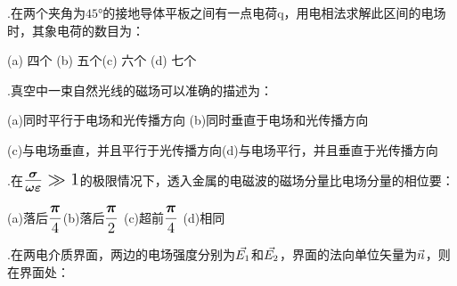.\hspace{0.8em}在两个夹角为$\ang{45}$的接地导体平板之间有一点电荷q，用电相法求解此区间的电场时，其象电荷的数目为：

\vspace{0.3cm}
(a)\hspace{0.6em} 四个 \hspace{1.6em}(b)\hspace{0.6em} 五个\hspace{1.6em}(c)\hspace{0.6em} 六个 \hspace{1.6em}(d)\hspace{0.6em} 七个
\vspace{0.3cm}

.\hspace{0.8em}真空中一束自然光线的磁场可以准确的描述为：

\vspace{0.3cm}
(a)\hspace{0.6em}同时平行于电场和光传播方向 \hspace{4.2em}(b)\hspace{0.6em}同时垂直于电场和光传播方向\hspace{1.6em}

(c)\hspace{0.6em}与电场垂直，并且平行于光传播方向\hspace{1.6em}(d)\hspace{0.6em}与电场平行，并且垂直于光传播方向
\vspace{0.3cm}

.\hspace{0.8em}在$\Large{ \boldsymbol{ \frac{\sigma}{\omega\varepsilon}}}  \gg 1 $的极限情况下，透入金属的电磁波的磁场分量比电场分量的相位要：

\vspace{0.3cm}
(a)\hspace{0.6em}落后$\displaystyle{\frac{ \large{\boldsymbol{\pi}}  }{ 4 }}$\hspace{1.6em}(b)\hspace{0.6em}落后$\displaystyle{\frac{ \large{\boldsymbol{\pi}}  }{ 2 }}$\hspace{1.6em}
(c)\hspace{0.6em}超前$\displaystyle{\frac{ \large{\boldsymbol{\pi}}  }{ 4 }}$\hspace{1.6em}
(d)\hspace{0.6em}相同
\vspace{0.3cm}

.\hspace{0.8em}在两电介质界面，两边的电场强度分别为$\large{ {\Vec{E_1}}}$和$\large{ {\Vec{E_2}}}$，界面的法向单位矢量为$\large{ \Vec{n} }$，则在界面处：

